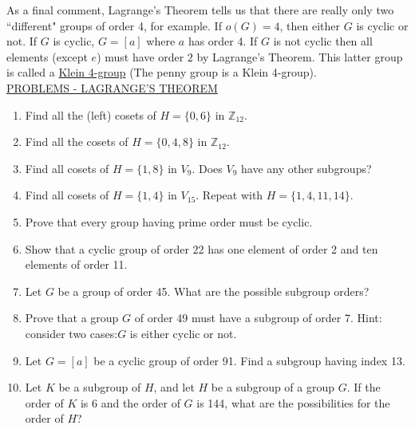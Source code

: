 \documentclass[12pt]{book}
\theoremstyle{definition}
\def\Z{\mathbb{Z}}
\begin{document}
As a final comment, Lagrange's Theorem tells us that there are really only two ``different" groups of order 4, for example. If $ o(G)=4 $, then either $ G $ is cyclic or not. If $ G $ is cyclic, $ G=[a] $ where $ a $ has order 4. If $ G $ is not cyclic then all elements (except $ e $) must have order $ 2 $ by Lagrange's Theorem. This latter group is called a \underline{Klein 4-group} (The penny group is a Klein 4-group).\\[.2in]
\underline{PROBLEMS - LAGRANGE'S THEOREM}
\begin{enumerate}
\item Find all the (left) cosets of $H=\{0,6\} $ in $\Z_{12}$.
\item Find all the cosets of $H=\{0,4,8\}$ in $\Z_{12}$.
\item Find all cosets of $H=\{1,8\}$ in $V_9$.  Does $V_9$ have any other subgroups?
\item Find all cosets of $H=\{1,4\}$ in $V_{15}$.  Repeat with $H=\{1,4,11,14\}$.
\item Prove that every group having prime order must be cyclic.
\item Show that a cyclic group of order 22 has one element of order 2 and ten elements of order 11.
\item Let $ G $ be a group of order 45. What are the possible subgroup orders?
\item Prove that a group $ G $ of order 49 must have a subgroup of order 7. Hint: consider two cases:$ G $ is either cyclic or not. 
\item Let $G=[a]$ be a cyclic group of order 91.  Find a subgroup having index 13.
\item Let $ K $ be a subgroup of $ H $, and let $ H $ be a subgroup of a group $ G $. If the order of $ K $ is 6 and the order of $ G $ is 144, what are the possibilities for the order of $ H $?
\end{enumerate}
\end{document}
